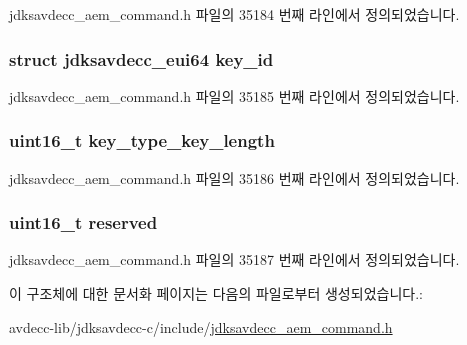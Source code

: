 jdksavdecc\+\_\+aem\+\_\+command.\+h 파일의 35184 번째 라인에서 정의되었습니다.

\subsubsection[{\texorpdfstring{key\+\_\+id}{key_id}}]{\setlength{\rightskip}{0pt plus 5cm}struct {\bf jdksavdecc\+\_\+eui64} key\+\_\+id}\hypertarget{structjdksavdecc__aem__command__auth__add__key_a37cbdf6056556ccfaee3ab01dc7c3032}{}\label{structjdksavdecc__aem__command__auth__add__key_a37cbdf6056556ccfaee3ab01dc7c3032}


jdksavdecc\+\_\+aem\+\_\+command.\+h 파일의 35185 번째 라인에서 정의되었습니다.

\subsubsection[{\texorpdfstring{key\+\_\+type\+\_\+key\+\_\+length}{key_type_key_length}}]{\setlength{\rightskip}{0pt plus 5cm}uint16\+\_\+t key\+\_\+type\+\_\+key\+\_\+length}\hypertarget{structjdksavdecc__aem__command__auth__add__key_aa4ab2c8fde3f5a7c664d627933272a14}{}\label{structjdksavdecc__aem__command__auth__add__key_aa4ab2c8fde3f5a7c664d627933272a14}


jdksavdecc\+\_\+aem\+\_\+command.\+h 파일의 35186 번째 라인에서 정의되었습니다.

\subsubsection[{\texorpdfstring{reserved}{reserved}}]{\setlength{\rightskip}{0pt plus 5cm}uint16\+\_\+t reserved}\hypertarget{structjdksavdecc__aem__command__auth__add__key_a5a6ed8c04a3db86066924b1a1bf4dad3}{}\label{structjdksavdecc__aem__command__auth__add__key_a5a6ed8c04a3db86066924b1a1bf4dad3}


jdksavdecc\+\_\+aem\+\_\+command.\+h 파일의 35187 번째 라인에서 정의되었습니다.



이 구조체에 대한 문서화 페이지는 다음의 파일로부터 생성되었습니다.\+:\begin{DoxyCompactItemize}
\item 
avdecc-\/lib/jdksavdecc-\/c/include/\hyperlink{jdksavdecc__aem__command_8h}{jdksavdecc\+\_\+aem\+\_\+command.\+h}\end{DoxyCompactItemize}
